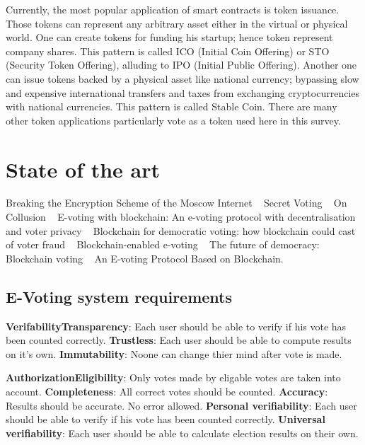 \documentclass[runningheads]{llncs}
\begin{document}
Currently, the most popular application of smart contracts is token issuance. Those tokens can represent any arbitrary asset either in the virtual or physical world. One can create tokens for funding his startup; hence token represent company shares. This pattern is called ICO (Initial Coin Offering) or STO (Security Token Offering), alluding to IPO (Initial Public Offering). Another one can issue tokens backed by a physical asset like national currency; bypassing slow and expensive international transfers and taxes from exchanging cryptocurrencies with national currencies. This pattern is called Stable Coin. There are many other token applications particularly vote as a token used here in this survey.

\section{State of the art}

Breaking the Encryption Scheme of the Moscow Internet ~\cite{gaudry2019breaking} Secret Voting ~\cite{tam_2018} On Collusion ~\cite{buterin_2019} E-voting with blockchain: An e-voting protocol with
decentralisation and voter privacy ~\cite{hardwick2018voting} Blockchain for democratic voting: how blockchain could cast of
voter fraud ~\cite{casado2018blockchain} Blockchain-enabled e-voting ~\cite{kshetri2018blockchain} The future of democracy: Blockchain voting ~\cite{osgood2016future} An E-voting Protocol Based on Blockchain. ~\cite{liu2017voting} 


\subsection{E-Voting system requirements}
\textbf{VerifabilityTransparency}: Each user should be able to verify if his vote has been counted correctly.
\textbf{Trustless}: Each user should be able to compute results on it's own.
\textbf{Immutability}: Noone can change thier mind after vote is made.

\textbf{AuthorizationEligibility}: Only votes made by eligable votes are taken into account.
\textbf{Completeness}: All correct votes should be counted. 
\textbf{Accuracy}: Results should be accurate. No error allowed.
\textbf{Personal verifiability}: Each user should be able to verify if his vote has been counted correctly.
\textbf{Universal verifiability}: Each user should be able to calculate election results on their own.
\end{document}
